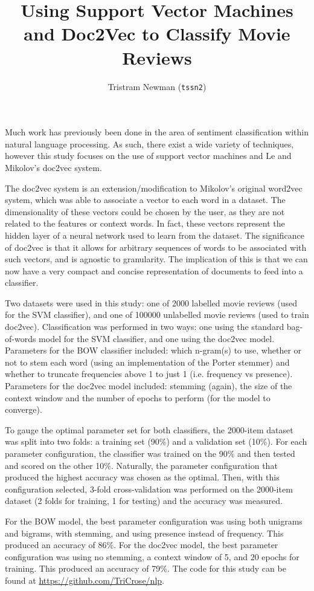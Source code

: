 \documentclass[a4paper, 12pt, twocolumn]{article}
\title{Using Support Vector Machines and Doc2Vec to Classify Movie Reviews}
\author{Tristram Newman (\texttt{tssn2})}
\date{\vspace{-1em}}
\begin{document}
\maketitle

Much work has previously been done in the area of sentiment classification within natural language processing. As such, there exist a wide variety of techniques, however this study focuses on the use of support vector machines and Le and Mikolov's doc2vec system.

The doc2vec system is an extension/modification to Mikolov's original word2vec system, which was able to associate a vector to each word in a dataset. The dimensionality of these vectors could be chosen by the user, as they are not related to the features or context words. In fact, these vectors represent the hidden layer of a neural network used to learn from the dataset. The significance of doc2vec is that it allows for arbitrary sequences of words to be associated with such vectors, and is agnostic to granularity. The implication of this is that we can now have a very compact and concise representation of documents to feed into a classifier.

Two datasets were used in this study: one of 2000 labelled movie reviews (used for the SVM classifier), and one of 100000 unlabelled movie reviews (used to train doc2vec). Classification was performed in two ways: one using the standard bag-of-words model for the SVM classifier, and one using the doc2vec model. Parameters for the BOW classifier included: which n-gram(s) to use, whether or not to stem each word (using an implementation of the Porter stemmer) and whether to truncate frequencies above 1 to just 1 (i.e. frequency vs presence). Parameters for the doc2vec model included: stemming (again), the size of the context window and the number of epochs to perform (for the model to converge).

To gauge the optimal parameter set for both classifiers, the 2000-item dataset was split into two folds: a training set (90\%) and a validation set (10\%). For each parameter configuration, the classifier was trained on the 90\% and then tested and scored on the other 10\%. Naturally, the parameter configuration that produced the highest accuracy was chosen as the optimal. Then, with this configuration selected, 3-fold cross-validation was performed on the 2000-item dataset (2 folds for training, 1 for testing) and the accuracy was measured.

For the BOW model, the best parameter configuration was using both unigrams and bigrams, with stemming, and using presence instead of frequency. This produced an accuracy of 86\%. For the doc2vec model, the best parameter configuration was using no stemming, a context window of 5, and 20 epochs for training. This produced an accuracy of 79\%. The code for this study can be found at \href{https://github.com/TriCrose/nlp}{https://github.com/TriCrose/nlp}.
\end{document}
